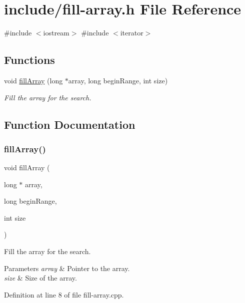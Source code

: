 \hypertarget{fill-array_8h}{}\section{include/fill-\/array.h File Reference}
\label{fill-array_8h}
{\ttfamily \#include $<$iostream$>$}\newline
{\ttfamily \#include $<$iterator$>$}\newline
\subsection*{Functions}
\begin{DoxyCompactItemize}
\item 
void \mbox{\hyperlink{fill-array_8h_a8bd6f3771616094f7842bc1a0d6c30ec}{fill\+Array}} (long $\ast$array, long begin\+Range, int size)
\begin{DoxyCompactList}\small\item\em Fill the array for the search. \end{DoxyCompactList}\end{DoxyCompactItemize}


\subsection{Function Documentation}
\mbox{\label{fill-array_8h_a8bd6f3771616094f7842bc1a0d6c30ec}} 
\subsubsection{\texorpdfstring{fillArray()}{fillArray()}}
{\footnotesize\ttfamily void fill\+Array (\begin{DoxyParamCaption}\item[{long $\ast$}]{array,  }\item[{long}]{begin\+Range,  }\item[{int}]{size }\end{DoxyParamCaption})}



Fill the array for the search. 


\begin{DoxyParams}{Parameters}
{\em array} & Pointer to the array. \\
\hline
{\em size} & Size of the array. \\
\hline
\end{DoxyParams}


Definition at line 8 of file fill-\/array.\+cpp.

